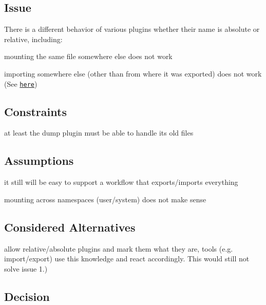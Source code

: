 \subsection*{Issue}

There is a different behavior of various plugins whether their name is absolute or relative, including\+:


\begin{DoxyEnumerate}
\item mounting the same file somewhere else does not work
\item importing somewhere else (other than from where it was exported) does not work (See \href{https://github.com/ElektraInitiative/libelektra/issues/51}{\tt here})
\end{DoxyEnumerate}

\subsection*{Constraints}


\begin{DoxyItemize}
\item at least the dump plugin must be able to handle its old files
\end{DoxyItemize}

\subsection*{Assumptions}


\begin{DoxyItemize}
\item it still will be easy to support a workflow that exports/imports everything
\item mounting across namespaces (user/system) does not make sense
\end{DoxyItemize}

\subsection*{Considered Alternatives}


\begin{DoxyItemize}
\item allow relative/absolute plugins and mark them what they are, tools (e.\+g. import/export) use this knowledge and react accordingly. This would still not solve issue 1.)
\end{DoxyItemize}

\subsection*{Decision}

